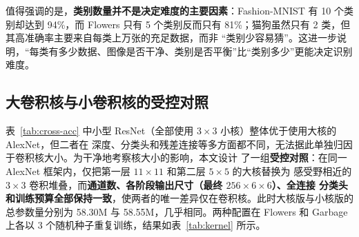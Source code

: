 \documentclass[12pt,a4paper,fontset=fandol]{ctexart}
\numberwithin{figure}{section}
\numberwithin{table}{section}
\numberwithin{equation}{section}
\begin{document}
\begin{table}[H]
  \centering
  \caption{AlexNet 在 Garbage 数据集上的每类 F1}
  \label{tab:garbage-f1}
\end{table}

值得强调的是，\textbf{类别数量并不是决定难度的主要因素}：Fashion-MNIST 有 10 个类别却达到 94\%，而
Flowers 只有 5 个类别反而只有 81\%；猫狗虽然只有 2 类，但其高准确率主要来自每类上万张的充足数据，而非
“类别少容易猜”。这进一步说明，“每类有多少数据、图像是否干净、类别是否平衡”比“类别多少”更能决定识别难度。

\subsection{大卷积核与小卷积核的受控对照}
表~\ref{tab:cross-acc} 中小型 ResNet（全部使用 $3\times3$ 小核）整体优于使用大核的 AlexNet，但二者在
深度、分类头和残差连接等多方面都不同，无法据此单独归因于卷积核大小。为干净地考察核大小的影响，本文设计
了一组\textbf{受控对照}：在同一 AlexNet 框架内，仅把第一层 $11\times11$ 和第二层 $5\times5$ 的大核替换为
感受野相近的 $3\times3$ 卷积堆叠，而\textbf{通道数、各阶段输出尺寸（最终 $256\times6\times6$）、全连接
分类头和训练预算全部保持一致}，使两者的唯一差异仅在卷积核。此时大核版与小核版的总参数量分别为 58.30M
与 58.55M，几乎相同。两种配置在 Flowers 和 Garbage 上各以 3 个随机种子重复训练，结果如表~\ref{tab:kernel}
所示。

\begin{table}[H]
  \centering
  \caption{大核与小核的受控对照（同一 AlexNet 框架，仅卷积核不同）}
  \label{tab:kernel}
\end{table}
\end{document}
